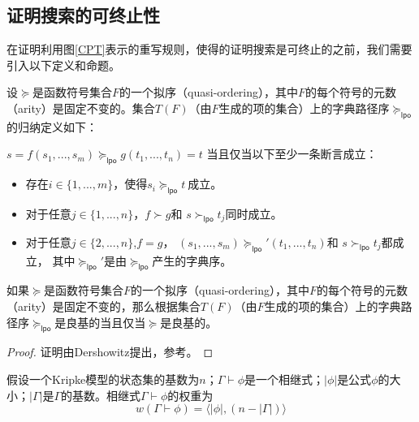 \subsection{证明搜索的可终止性}
在证明利用图\ref{CPT}表示的重写规则，使得\sctlprov{}的证明搜索是可终止的之前，我们需要引入以下定义和命题。

\begin{definition}
	设$\succeq$是函数符号集合$F$的一个拟序（quasi-ordering），其中$F$的每个符号的元数（arity）是固定不变的。集合$T(F)$（由$F$生成的项的集合）上的字典路径序$\succeq_{\mathsf{lpo}}$的归纳定义如下：
	
	$s=f(s_1,...,s_m)\succeq_{\mathsf{lpo}}g(t_1,...,t_n)=t$ 
	当且仅当以下至少一条断言成立：
	\begin{itemize}
		\item 存在$i\in\{1,...,m\}$，使得$s_i\succeq_{\mathsf{lpo}} t~$成立。
		\item 对于任意$j\in\{1,...,n\}$，$f\succ g$和 $s\succ_{\mathsf{lpo}} t_j$同时成立。
		\item 对于任意$j\in\{2,...,n\}$,$f=g$， $(s_1,...,s_m)\succeq_{\mathsf{lpo}}'(t_1,..., t_n)$和 $s\succ_{\mathsf{lpo}}t_j$都成立，
		其中$\succeq_{\mathsf{lpo}}'$是由$\succeq_{\mathsf{lpo}}$产生的字典序。
	\end{itemize}
\end{definition}

\begin{proposition}
	[字典路径序的良基性]\label{termination:well-foundness}
	如果$\succeq$是函数符号集合$F$的一个拟序（quasi-ordering），其中$F$的每个符号的元数（arity）是固定不变的，那么根据集合$T(F)$（由$F$生成的项的集合）上的字典路径序$\succeq_{\mathsf{lpo}}$是良基的当且仅当$\succeq$是良基的。
\end{proposition}
\begin{proof}
	证明由Dershowitz提出，参考\cite{Dershowitz87}。
\end{proof}

\begin{definition}[相继式的权重]
	假设一个Kripke模型的状态集的基数为$n$；$\Gamma\vdash\phi$是一个\sctlm{}相继式；$|\phi|$是公式$\phi$的大小；$|\Gamma|$是$\Gamma$的基数。相继式$\Gamma\vdash\phi$的权重为$$w(\Gamma\vdash \phi) = \langle|\phi|, (n - |\Gamma|)\rangle$$
\end{definition}

